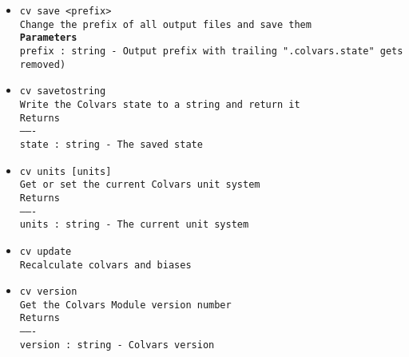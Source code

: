 \begin{itemize}
\item \texttt{cv save <prefix>}
\\
\texttt{Change the prefix of all output files and save them}
\\
\texttt{\textbf{Parameters}}
\\
\texttt{prefix : string - Output prefix with trailing ".colvars.state" gets removed)}
\item \texttt{cv savetostring}
\\
\texttt{Write the Colvars state to a string and return it}
\\
\texttt{Returns}
\\
\texttt{-------}
\\
\texttt{state : string - The saved state}
\item \texttt{cv units [units]}
\\
\texttt{Get or set the current Colvars unit system}
\\
\texttt{Returns}
\\
\texttt{-------}
\\
\texttt{units : string - The current unit system}
\item \texttt{cv update}
\\
\texttt{Recalculate colvars and biases}
\item \texttt{cv version}
\\
\texttt{Get the Colvars Module version number}
\\
\texttt{Returns}
\\
\texttt{-------}
\\
\texttt{version : string - Colvars version}
\end{itemize}
